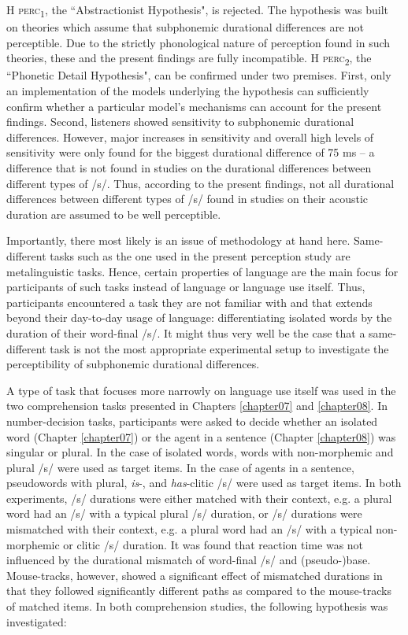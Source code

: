 \textsc{H perc\textsubscript{1}}, the ``Abstractionist Hypothesis", is rejected. The hypothesis was built on theories which assume that subphonemic durational differences are not perceptible. Due to the strictly phonological nature of perception found in such theories, these and the present findings are fully incompatible. \textsc{H perc\textsubscript{2}}, the ``Phonetic Detail Hypothesis", can be confirmed under two premises. First, only an implementation of the models underlying the hypothesis can sufficiently confirm whether a particular model’s mechanisms can account for the present findings. Second, listeners showed sensitivity to subphonemic durational differences. However, major increases in sensitivity and overall high levels of sensitivity were only found for the biggest durational difference of 75 ms – a difference that is not found in studies on the durational differences between different types of /s/. Thus, according to the present findings, not all durational differences between different types of /s/ found in studies on their acoustic duration are assumed to be well perceptible. 

Importantly, there most likely is an issue of methodology at hand here. Same-different tasks such as the one used in the present perception study are metalinguistic tasks. Hence, certain properties of language are the main focus for participants of such tasks instead of language or language use itself. Thus, participants encountered a task they are not familiar with and that extends beyond their day-to-day usage of language: differentiating isolated words by the duration of their word-final /s/. It might thus very well be the case that a same-different task is not the most appropriate experimental setup to investigate the perceptibility of subphonemic durational differences.

A type of task that focuses more narrowly on language use itself was used in the two comprehension tasks presented in Chapters \ref{chapter07} and \ref{chapter08}. In number-decision tasks, participants were asked to decide whether an isolated word (Chapter \ref{chapter07}) or the agent in a sentence (Chapter \ref{chapter08}) was singular or plural. In the case of isolated words, words with non-morphemic and plural /s/ were used as target items. In the case of agents in a sentence, pseudowords with plural, \textit{is}-, and \textit{has}-clitic /s/ were used as target items. In both experiments, /s/ durations were either matched with their context, e.g. a plural word had an /s/ with a typical plural /s/ duration, or /s/ durations were mismatched with their context, e.g. a plural word had an /s/ with a typical non-morphemic or clitic /s/ duration. It was found that reaction time was not influenced by the durational mismatch of word-final /s/ and (pseudo-)base. Mouse-tracks, however, showed a significant effect of mismatched durations in that they followed significantly different paths as compared to the mouse-tracks of matched items. In both comprehension studies, the following hypothesis was investigated:

